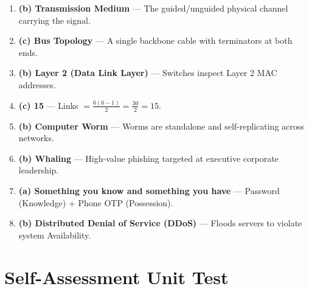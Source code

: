 \begin{solutionbox}
\begin{enumerate}
    \item \textbf{(b) Transmission Medium} --- The guided/unguided physical channel carrying the signal.
    \item \textbf{(c) Bus Topology} --- A single backbone cable with terminators at both ends.
    \item \textbf{(b) Layer 2 (Data Link Layer)} --- Switches inspect Layer 2 MAC addresses.
    \item \textbf{(c) 15} --- Links $= \frac{6(6-1)}{2} = \frac{30}{2} = 15$.
    \item \textbf{(b) Computer Worm} --- Worms are standalone and self-replicating across networks.
    \item \textbf{(b) Whaling} --- High-value phishing targeted at executive corporate leadership.
    \item \textbf{(a) Something you know and something you have} --- Password (Knowledge) + Phone OTP (Possession).
    \item \textbf{(b) Distributed Denial of Service (DDoS)} --- Floods servers to violate system Availability.
\end{enumerate}
\end{solutionbox}

\section{Self-Assessment Unit Test}

